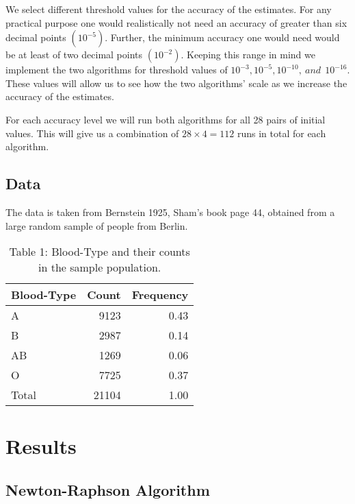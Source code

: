 \documentclass[]{article}
\begin{document}
We select different threshold values for the accuracy of the estimates.
For any practical purpose one would realistically not need an accuracy
of greater than six decimal points \((10^{-5})\). Further, the minimum
accuracy one would need would be at least of two decimal points
\((10^{-2})\). Keeping this range in mind we implement the two
algorithms for threshold values of
\(10^{-3}, 10^{-5}, 10^{-10}, \: and \: \: 10^{-16}\). These values will
allow us to see how the two algorithms' scale as we increase the
accuracy of the estimates.

For each accuracy level we will run both algorithms for all 28 pairs of
initial values. This will give us a combination of \(28 \times 4 = 112\)
runs in total for each algorithm.

\subsection{Data}\label{data}

The data is taken from Bernstein 1925, Sham's book page 44, obtained
from a large random sample of people from Berlin.

\begin{table}[t]

\caption{\label{tab:Data}Table 1: Blood-Type and their counts in the sample population.}
\centering
\begin{tabular}{l|r|r}
\hline
Blood-Type & Count & Frequency\\
\hline
A & 9123 & 0.43\\
\hline
B & 2987 & 0.14\\
\hline
AB & 1269 & 0.06\\
\hline
O & 7725 & 0.37\\
\hline
Total & 21104 & 1.00\\
\hline
\end{tabular}
\end{table}

\section{Results}\label{results}

\subsection{Newton-Raphson Algorithm}\label{newton-raphson-algorithm}
\end{document}
